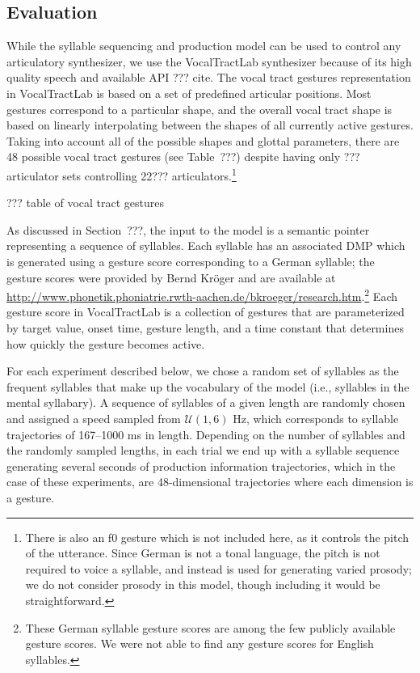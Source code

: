 \subsection{Evaluation}

While the syllable sequencing and production model
can be used to control any articulatory synthesizer,
we use the VocalTractLab synthesizer
because of its high quality speech
and available API ??? cite.
The vocal tract gestures representation
in VocalTractLab is based on a set of
predefined articular positions.
Most gestures correspond to
a particular shape,
and the overall vocal tract shape
is based on linearly interpolating
between the shapes of
all currently active gestures.
Taking into account all of the
possible shapes and glottal parameters,
there are 48 possible vocal tract gestures
(see Table~???) despite having only
??? articulator sets
controlling 22??? articulators.\footnote{
  There is also an f0 gesture which is not included here,
  as it controls the pitch of the utterance.
  Since German is not a tonal language,
  the pitch is not required to voice a syllable,
  and instead is used for generating
  varied prosody;
  we do not consider prosody in this model,
  though including it would be straightforward.}

??? table of vocal tract gestures

As discussed in Section~???,
the input to the model
is a semantic pointer
representing a sequence of syllables.
Each syllable has an associated DMP
which is generated using
a gesture score corresponding to
a German syllable;
the gesture scores were provided by
Bernd Kr\"{o}ger and are available at
\url{http://www.phonetik.phoniatrie.rwth-aachen.de/bkroeger/research.htm}.\footnote{
  These German syllable gesture scores are among
  the few publicly available gesture scores.
  We were not able to find any gesture scores
  for English syllables.}
Each gesture score in VocalTractLab
is a collection of
gestures that are parameterized by target value,
onset time, gesture length,
and a time constant that determines
how quickly the gesture becomes active.

For each experiment described below,
we chose a random set of syllables
as the frequent syllables
that make up the vocabulary
of the model
(i.e., syllables in the mental syllabary).
A sequence of syllables of a given length
are randomly chosen and assigned a speed
sampled from $\mathcal{U}(1, 6)$ Hz,
which corresponds to syllable trajectories of
167--1000 ms in length.
Depending on the number of syllables
and the randomly sampled lengths,
in each trial we end up with a syllable sequence
generating several seconds
of production information trajectories,
which in the case of these experiments,
are 48-dimensional trajectories
where each dimension is a gesture.

